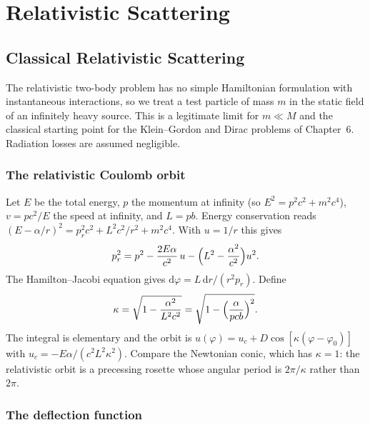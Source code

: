 \documentclass[11pt,a4paper]{book}
\numberwithin{equation}{chapter}
\newcommand{\dd}{\mathrm{d}}
\begin{document}
\part{Relativistic Scattering}

\chapter{Classical Relativistic Scattering}

The relativistic two-body problem has no simple Hamiltonian formulation with
instantaneous interactions, so we treat a test particle of mass $m$ in the
static field of an infinitely heavy source. This is a legitimate limit for
$m\ll M$ and the classical starting point for the Klein--Gordon and Dirac
problems of Chapter~6. Radiation losses are assumed negligible.

\section{The relativistic Coulomb orbit}

Let $E$ be the total energy, $p$ the momentum at infinity (so
$E^2=p^2c^2+m^2c^4$), $v=pc^2/E$ the speed at infinity, and $L=pb$. Energy
conservation reads $(E-\alpha/r)^2=p_r^2c^2+L^2c^2/r^2+m^2c^4$. With $u=1/r$
this gives
\begin{equation}\label{eq:pr2}
  p_r^2=p^2-\frac{2E\alpha}{c^2}\,u-\Bigl(L^2-\frac{\alpha^2}{c^2}\Bigr)u^2 .
\end{equation}
The Hamilton--Jacobi equation gives $\dd\varphi=L\,\dd r/(r^2p_r)$. Define
\begin{equation}\label{eq:kappa}
  \kappa=\sqrt{1-\frac{\alpha^2}{L^2c^2}}=\sqrt{1-\Bigl(\frac{\alpha}{pcb}\Bigr)^2}.
\end{equation}
The integral is elementary and the orbit is
$u(\varphi)=u_c+D\cos[\kappa(\varphi-\varphi_0)]$ with
$u_c=-E\alpha/(c^2L^2\kappa^2)$. Compare the Newtonian conic, which has
$\kappa=1$: the relativistic orbit is a precessing rosette whose angular period
is $2\pi/\kappa$ rather than $2\pi$.

\section{The deflection function}
\end{document}
